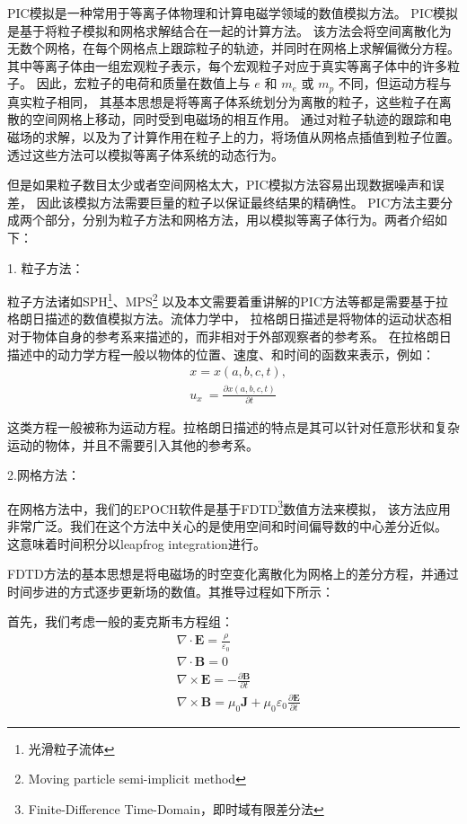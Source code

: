 PIC模拟是一种常用于等离子体物理和计算电磁学领域的数值模拟方法。
PIC模拟是基于将粒子模拟和网格求解结合在一起的计算方法。
该方法会将空间离散化为无数个网格，在每个网格点上跟踪粒子的轨迹，并同时在网格上求解偏微分方程。
其中等离子体由一组宏观粒子表示，每个宏观粒子对应于真实等离子体中的许多粒子。
因此，宏粒子的电荷和质量在数值上与 $e$ 和 $m_e$ 或 $m_p$ 不同，但运动方程与真实粒子相同\cite{Pohl_2020}，
其基本思想是将等离子体系统划分为离散的粒子，这些粒子在离散的空间网格上移动，同时受到电磁场的相互作用。
通过对粒子轨迹的跟踪和电磁场的求解，以及为了计算作用在粒子上的力，将场值从网格点插值到粒子位置。
透过这些方法可以模拟等离子体系统的动态行为。

但是如果粒子数目太少或者空间网格太大，PIC模拟方法容易出现数据噪声和误差，
因此该模拟方法需要巨量的粒子以保证最终结果的精确性。
PIC方法主要分成两个部分，分别为粒子方法和网格方法，用以模拟等离子体行为。两者介绍如下：

1. 粒子方法：

粒子方法诸如SPH\footnote{光滑粒子流体}、MPS\footnote{Moving particle semi-implicit method}
以及本文需要着重讲解的PIC方法等都是需要基于拉格朗日描述的数值模拟方法。流体力学中，
拉格朗日描述是将物体的运动状态相对于物体自身的参考系来描述的，而非相对于外部观察者的参考系。
在拉格朗日描述中的动力学方程一般以物体的位置、速度、和时间的函数来表示，例如：
\begin{equation}
    \begin{aligned}
        &\displaystyle x=x\left(a,b,c,t\right), \\
        &\displaystyle u_x\ =\frac{\partial x\left(a,b,c,t\right)}{\partial t}
    \end{aligned}
\end{equation}

这类方程一般被称为运动方程。拉格朗日描述的特点是其可以针对任意形状和复杂运动的物体，并且不需要引入其他的参考系。

2.网格方法：

在网格方法中，我们的EPOCH软件是基于FDTD\footnote{Finite-Difference Time-Domain，即时域有限差分法}数值方法来模拟，
该方法应用非常广泛。我们在这个方法中关心的是使用空间和时间偏导数的中心差分近似。 
这意味着时间积分以leapfrog integration\cite{Skeel1993}进行。

FDTD方法的基本思想是将电磁场的时空变化离散化为网格上的差分方程，并通过时间步进的方式逐步更新场的数值。其推导过程如下所示：

首先，我们考虑一般的麦克斯韦方程组\cite{Meagher_2020}：
\begin{equation}
    \begin{aligned}
        &\displaystyle\nabla \cdot \mathbf{E} = \frac{\rho}{\varepsilon_0} \\
        &\displaystyle\nabla \cdot \mathbf{B} = 0 \\
        &\displaystyle\nabla \times \mathbf{E} = -\frac{\partial \mathbf{B}}{\partial t} \\
        &\displaystyle\nabla \times \mathbf{B} = \mu_0 \mathbf{J} + \mu_0 \varepsilon_0 \frac{\partial \mathbf{E}}{\partial t}
    \end{aligned}
\end{equation}


